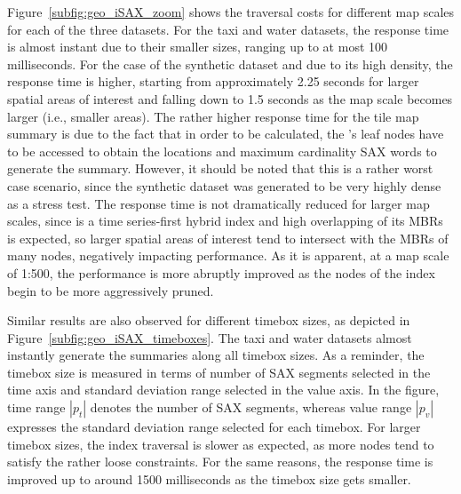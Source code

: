 Figure~\ref{subfig:geo_iSAX_zoom} shows the traversal costs for different map scales for each of the three datasets. For the taxi and water datasets, the response time is almost instant due to their smaller sizes, ranging up to at most 100 milliseconds. For the case of the synthetic dataset and due to its high density, the response time is higher, starting from approximately 2.25 seconds for larger spatial areas of interest and falling down to 1.5 seconds as the map scale becomes larger (i.e., smaller areas). The rather higher response time for the tile map summary is due to the fact that in order to be calculated, the \hisax's leaf nodes have to be accessed to obtain the locations and maximum cardinality SAX words to generate the summary. However, it should be noted that this is a rather worst case scenario, since the synthetic dataset was generated to be very highly dense as a stress test. The response time is not dramatically reduced for larger map scales, since \hisax is a time series-first hybrid index and high overlapping of its MBRs is expected, so larger spatial areas of interest tend to intersect with the MBRs of many nodes, negatively impacting performance. As it is apparent, at a map scale of 1:500, the performance is more abruptly improved as the nodes of the index begin to be more aggressively pruned.

Similar results are also observed for different timebox sizes, as depicted in Figure~\ref{subfig:geo_iSAX_timeboxes}. The taxi and water datasets almost instantly generate the summaries along all timebox sizes. As a reminder, the timebox size is measured in terms of number of SAX segments selected in the time axis and standard deviation range selected in the value axis. In the figure, time range $|p_t|$ denotes the number of SAX segments, whereas value range $|p_v|$ expresses the standard deviation range selected for each timebox. For larger timebox sizes, the index traversal is slower as expected, as more nodes tend to satisfy the rather loose constraints. For the same reasons, the response time is improved up to around 1500 milliseconds as the timebox size gets smaller.

